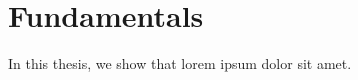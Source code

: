 \chapter*{Fundamentals}
\label{cha:hey}

In this thesis, we show that lorem ipsum dolor sit amet.



